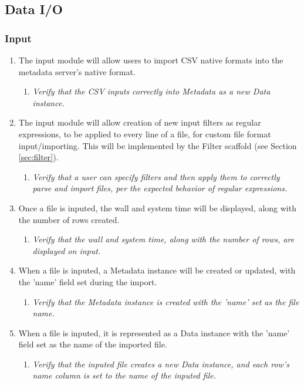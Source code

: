 \subsection{Data I/O}
\label{sec:data_io_spec} 

\subsubsection{Input}
	\begin{enumerate}
		\item The input module will allow users to import CSV native 
			formats into the metadata server’s native format.
		\begin{enumerate}
			\item \textit{Verify that the CSV inputs correctly
					into Metadata as a new Data instance.}
		\end{enumerate}
		
		\item The input module will allow creation of new input filters
			as regular expressions, to be applied to every line
			of a file, for custom file format input/importing. This
			will be implemented by the Filter scaffold (see 
			Section \ref{sec:filter}).
		\begin{enumerate}
			\item \textit{Verify that a user can specify filters
				and then apply them to correctly parse and 
				import files, per the expected behavior
				of regular expressions.}
		\end{enumerate}

		\item Once a file is inputed, the wall and system time will be
			displayed, along with the number of rows created.
		\begin{enumerate}
			\item \textit{ Verify that the wall and system time, 
					along with the number of rows, are
					displayed on input.}
		\end{enumerate}

		\item When a file is inputed, a Metadata instance will be 
			created or updated, with the 'name' field set during 
			the import.
		\begin{enumerate}
			\item \textit{ Verify that the Metadata instance is
					created with the 'name' set as the
					file name. }
		\end{enumerate}

		\item When a file is inputed, it is represented as a Data 
			instance with the 'name' field set as the name of the
			imported file.
		\begin{enumerate}
			\item \textit{ Verify that the inputed file creates 
					a new Data instance, and each row's
					name column is set to the name of the
					inputed file.}
		\end{enumerate}


\end{enumerate}
